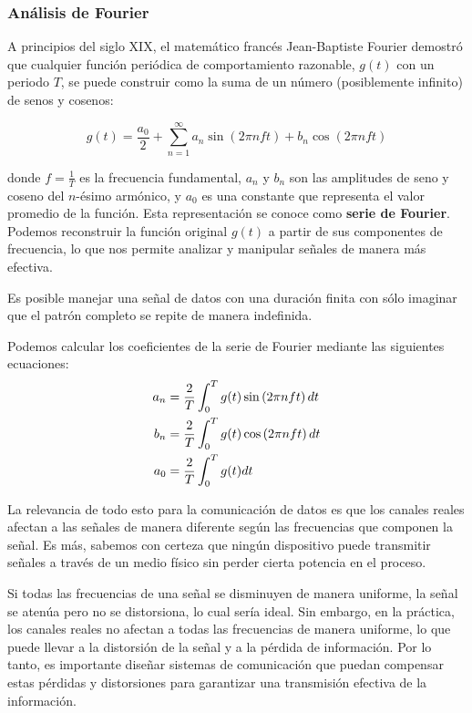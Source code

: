 \subsubsection{Análisis de Fourier}

A principios del siglo XIX, el matemático francés Jean-Baptiste Fourier demostró que cualquier función periódica de comportamiento razonable, $g(t)$ con un periodo $T$, se puede construir como la suma de un número (posiblemente infinito) de senos y cosenos:

$$g(t) = \frac{a_0}{2} + \sum_{n=1}^{\infty} a_n \sin\left(2\pi nft\right) + b_n \cos\left(2\pi nft\right)$$

donde $f = \frac{1}{T}$ es la frecuencia fundamental, $a_n$ y $b_n$ son las amplitudes de seno y coseno del $n$-ésimo armónico, y $a_0$ es una constante que representa el valor promedio de la función. Esta representación se conoce como \textbf{serie de Fourier}. Podemos reconstruir la función original $g(t)$ a partir de sus componentes de frecuencia, lo que nos permite analizar y manipular señales de manera más efectiva.

Es posible manejar una señal de datos con una duración finita con sólo imaginar que el patrón completo se repite de manera indefinida. 

Podemos calcular los coeficientes de la serie de Fourier mediante las siguientes ecuaciones:
\begin{align}
  a_n &= \frac{2}{T} \int_{0}^{T} g(t) \sin\left(2\pi nft\right) dt \notag \\
  b_n &= \frac{2}{T} \int_{0}^{T} g(t) \cos\left(2\pi nft\right) dt \notag \\
  a_0 &= \frac{2}{T} \int_{0}^{T} g(t) dt \notag
\end{align}

La relevancia de todo esto para la comunicación de datos es que los canales reales afectan a las señales de manera diferente según las frecuencias que componen la señal. Es más, sabemos con certeza que ningún dispositivo puede transmitir señales a través de un medio físico sin perder cierta potencia en el proceso. 

Si todas las frecuencias de una señal se disminuyen de manera uniforme, la señal se atenúa pero no se distorsiona, lo cual sería ideal. Sin embargo, en la práctica, los canales reales no afectan a todas las frecuencias de manera uniforme, lo que puede llevar a la distorsión de la señal y a la pérdida de información. Por lo tanto, es importante diseñar sistemas de comunicación que puedan compensar estas pérdidas y distorsiones para garantizar una transmisión efectiva de la información.


